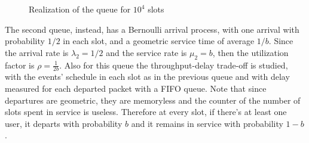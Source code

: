 \documentclass[10pt]{article}
\begin{document}
\begin{figure}[h!]
\centering
  \caption{Realization of the queue for $10^4$ slots}
  \label{fig:queue_a_real}
\end{figure}


The second queue, instead, has a Bernoulli arrival process, with one arrival with probability $1/2$ in each slot, and a geometric service time of average $1/b$. Since the arrival rate is $\lambda_2 = 1/2$ and the service rate is $\mu_2 = b$, then the utilization factor is $\rho = \frac{1}{2b}$. Also for this queue the throughput-delay trade-off is studied, with the events' schedule in each slot as in the previous queue and with delay measured for each departed packet with a FIFO queue. Note that since departures are geometric, they are memoryless and the counter of the number of slots spent in service is useless. Therefore at every slot, if there's at least one user, it departs with probability $b$ and it remains in service with probability $1-b$. 
\end{document}
